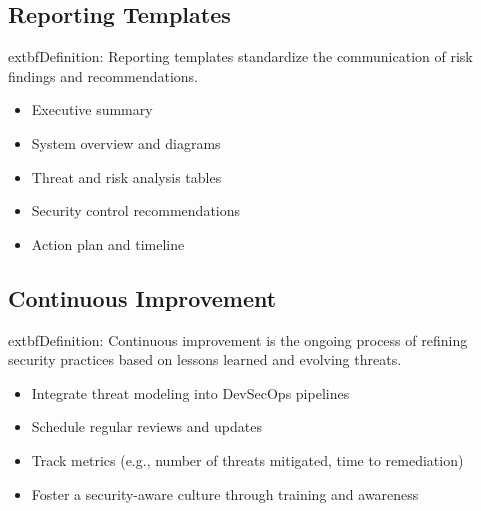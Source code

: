 \subsection*{Reporting Templates}
	extbf{Definition:} Reporting templates standardize the communication of risk findings and recommendations\cite{shostack2014}.
\begin{itemize}
	\item Executive summary
	\item System overview and diagrams
	\item Threat and risk analysis tables
	\item Security control recommendations
	\item Action plan and timeline
\end{itemize}

\subsection*{Continuous Improvement}
	extbf{Definition:} Continuous improvement is the ongoing process of refining security practices based on lessons learned and evolving threats\cite{owasp}.
\begin{itemize}
	\item Integrate threat modeling into DevSecOps pipelines
	\item Schedule regular reviews and updates
	\item Track metrics (e.g., number of threats mitigated, time to remediation)
	\item Foster a security-aware culture through training and awareness
\end{itemize}
